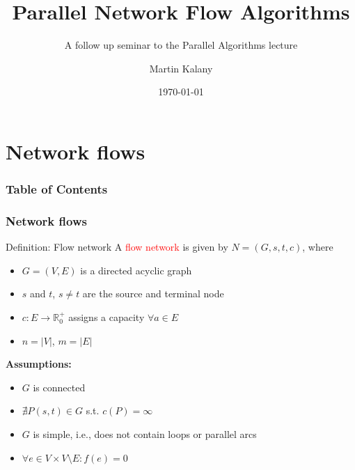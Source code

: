 \documentclass{beamer}
\title{Parallel Network Flow Algorithms}
\subtitle{A follow up seminar to the Parallel Algorithms lecture}
\author{Martin Kalany }
\institute
{
  
  Graduate student in Computer Science\\
  Vienna University of Technology\\
}
\date{\today}
\begin{document}

\frame{\titlepage}
\section{Network flows}
\begin{frame}
    \frametitle{Table of Contents}
    \tableofcontents
  \end{frame}
  
\begin{frame}
	\frametitle{Network flows}
    \begin{block}{Definition: Flow network}
    A \textcolor{red}{flow network}   is given by $N = (G,s,t,c)$, where
    \begin{itemize}
    		\item $G =(V,E)$ is a directed acyclic graph
    		\item $s$ and $t$, $s \neq t$ are the source and terminal node
    		\item $c:E\rightarrow \mathbb{R}_0^{+}$ assigns a capacity $\forall a \in E$
    		\item $n=\lvert V\rvert$, $m=\lvert E\rvert$
    \end{itemize}
    \end{block}
    \textbf{Assumptions:}
	\begin{itemize}
		\item $G$ is connected
		\item $\nexists P(s,t) \in G$ s.t. $c(P) = \infty$
		\item $G$ is simple, i.e., does not contain loops or parallel arcs
		\item $\forall e \in V\times V \setminus E: f(e) = 0$
	\end{itemize}
\end{frame}
  
\end{document}
